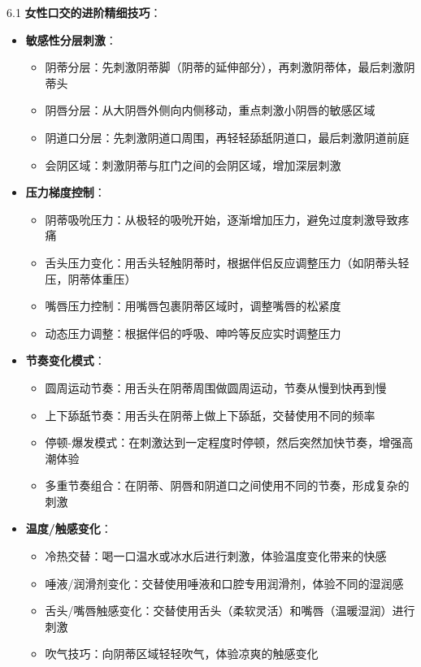 \documentclass[12pt,UTF8]{ctexbook}
\begin{document}
6.1 \textbf{女性口交的进阶精细技巧}：
\begin{itemize}
	\item \textbf{敏感性分层刺激}：
	\begin{itemize}
		\item 阴蒂分层：先刺激阴蒂脚（阴蒂的延伸部分），再刺激阴蒂体，最后刺激阴蒂头
		\item 阴唇分层：从大阴唇外侧向内侧移动，重点刺激小阴唇的敏感区域
		\item 阴道口分层：先刺激阴道口周围，再轻轻舔舐阴道口，最后刺激阴道前庭
		\item 会阴区域：刺激阴蒂与肛门之间的会阴区域，增加深层刺激
	\end{itemize}
	\item \textbf{压力梯度控制}：
	\begin{itemize}
		\item 阴蒂吸吮压力：从极轻的吸吮开始，逐渐增加压力，避免过度刺激导致疼痛
		\item 舌头压力变化：用舌头轻触阴蒂时，根据伴侣反应调整压力（如阴蒂头轻压，阴蒂体重压）
		\item 嘴唇压力控制：用嘴唇包裹阴蒂区域时，调整嘴唇的松紧度
		\item 动态压力调整：根据伴侣的呼吸、呻吟等反应实时调整压力
	\end{itemize}
	\item \textbf{节奏变化模式}：
	\begin{itemize}
		\item 圆周运动节奏：用舌头在阴蒂周围做圆周运动，节奏从慢到快再到慢
		\item 上下舔舐节奏：用舌头在阴蒂上做上下舔舐，交替使用不同的频率
		\item 停顿-爆发模式：在刺激达到一定程度时停顿，然后突然加快节奏，增强高潮体验
		\item 多重节奏组合：在阴蒂、阴唇和阴道口之间使用不同的节奏，形成复杂的刺激
	\end{itemize}
	\item \textbf{温度/触感变化}：
	\begin{itemize}
		\item 冷热交替：喝一口温水或冰水后进行刺激，体验温度变化带来的快感
		\item 唾液/润滑剂变化：交替使用唾液和口腔专用润滑剂，体验不同的湿润感
		\item 舌头/嘴唇触感变化：交替使用舌头（柔软灵活）和嘴唇（温暖湿润）进行刺激
		\item 吹气技巧：向阴蒂区域轻轻吹气，体验凉爽的触感变化
	\end{itemize}
\end{itemize}
\end{document}
